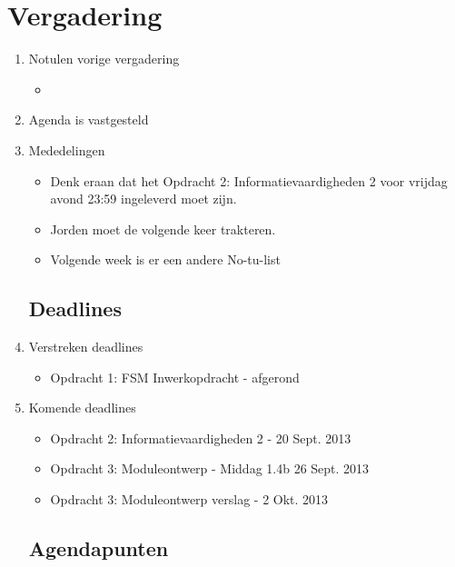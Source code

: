 \documentclass{article}
\begin{document}
\section*{Vergadering}
\begin{enumerate}
	
	\subsection*{Vooraf}
	\item Notulen vorige vergadering
	\begin{itemize}
		\item
	\end{itemize}

	\item Agenda is vastgesteld
	\item Mededelingen
	\begin{itemize}
		\item Denk eraan dat het Opdracht 2: Informatievaardigheden 2 voor vrijdag avond 23:59 ingeleverd moet zijn.
		\item Jorden moet de volgende keer trakteren.
		\item Volgende week is er een andere No-tu-list
	\end{itemize}

	\subsection*{Deadlines}
	\item Verstreken deadlines
	\begin{itemize}
		\item
		Opdracht 1: FSM Inwerkopdracht - afgerond
	\end{itemize}
	\item Komende deadlines
	\begin{itemize}
		\item	Opdracht 2: Informatievaardigheden 2 - 20 Sept. 2013
		\item	Opdracht 3: Moduleontwerp -  Middag 1.4b 26 Sept. 2013
		\item   Opdracht 3: Moduleontwerp verslag - 2 Okt. 2013
	\end{itemize}

	\subsection*{Agendapunten}
	


\end{enumerate}
\end{document}
